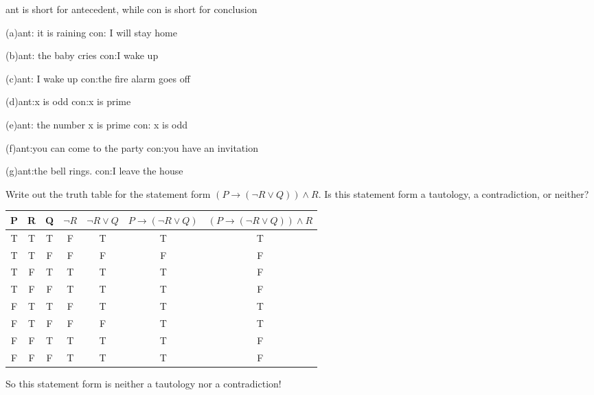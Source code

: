\documentclass[11pt, a4paper, UTF8]{ctexart}
\begin{document}
\begin{solution}
ant is short for antecedent, while con is short for conclusion
 
(a)ant: it is raining                     con: I will stay home

(b)ant: the baby cries                con:I wake up

(c)ant: I wake up    con:the fire alarm goes off

(d)ant:x is  odd                          con:x is prime

(e)ant: the number x is prime    con: x is odd

(f)ant:you can come to the party con:you have an invitation

(g)ant:the bell rings.                    con:I leave the house
\end{solution}
\newpage
\begin{problem}[UD: 2.5]
Write out the truth table for the statement form $(P \rightarrow (\neg R \vee Q)) \wedge R$. Is this statement form a tautology, a contradiction, or neither?

\end{problem}
\begin{solution}
\begin{tabular}{|c|c|c|c|c|c|c|}
 \hline
 P & R & Q & $\neg R $ & $\neg R \vee Q$ & $P \rightarrow (\neg R \vee Q)$ & $(P \rightarrow (\neg R \vee Q)) \wedge R$\\
 \hline
 T & T & T &      F    &       T           &         T                 & T\\
 \hline
 T & T & F &      F    &       F           &         F                 & F\\
 \hline
 T & F & T &      T    &       T           &         T                 & F\\
 \hline
 T & F & F &      T    &       T           &         T                 & F\\
 \hline
 F & T & T &      F    &       T           &         T                 & T\\
 \hline
 F & T & F &      F    &       F           &         T                 & T\\
 \hline
 F & F & T &      T    &       T           &         T                 & F\\
 \hline
 F & F & F &      T    &       T           &         T                 & F\\
\hline
\end{tabular}
So this statement form is neither a tautology nor a contradiction!
\end{solution}
\end{document}
